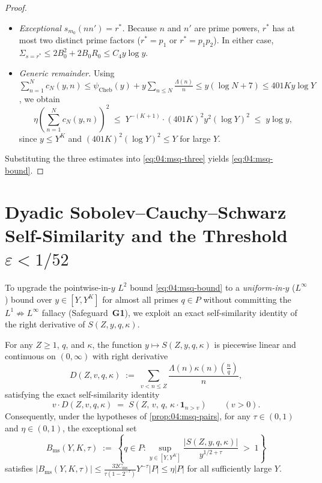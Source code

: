 \begin{proof}
\begin{itemize}
\item \emph{Exceptional $s_{m_0}(n n') = r^*$.} Because $n$ and $n'$ are prime powers, $r^*$ has at most two distinct prime factors ($r^* = p_1$ or $r^* = p_1 p_2$). In either case, $\Sigma_{s=r^*} \le 2 B_0^2 + 2 B_0 R_0 \le C_4 y\log y$.

\item \emph{Generic remainder.} Using $\sum_{n=1}^N c_N(y, n) \le \psi_{\mathrm{Cheb}}(y) + y\sum_{n \le N} \frac{\Lambda(n)}{n} \le y(\log N + 7) \le 401 K y \log Y$, we obtain
  \[
    \eta\!\left(\sum_{n=1}^N c_N(y, n)\right)^2 \;\le\; Y^{-(K+1)} \cdot (401 K)^2 y^2 (\log Y)^2 \;\le\; y \log y,
  \]
  since $y \le Y^K$ and $(401 K)^2 (\log Y)^2 \le Y$ for large $Y$.
\end{itemize}
Substituting the three estimates into \eqref{eq:04:msq-three} yields \eqref{eq:04:msq-bound}.
\end{proof}

\section{Dyadic Sobolev--Cauchy--Schwarz Self-Similarity and the Threshold $\varepsilon < 1/52$}
\label{sec:04:sobolev-perron}

To upgrade the pointwise-in-$y$ $L^2$ bound \eqref{eq:04:msq-bound} to a \emph{uniform-in-$y$} ($L^\infty$) bound over $y \in [Y, Y^K]$ for almost all primes $q \in P$ without committing the $L^1 \not\Rightarrow L^\infty$ fallacy (Safeguard~\textbf{G1}), we exploit an exact self-similarity identity of the right derivative of $S(Z, y, q, \kappa)$.

\begin{lemma}
\label{lem:04:sobolev-selfsim}
For any $Z \ge 1$, $q$, and $\kappa$, the function $y \mapsto S(Z, y, q, \kappa)$ is piecewise linear and continuous on $(0, \infty)$ with right derivative
\[
  D(Z, v, q, \kappa) \;:=\; \sum_{v < n \le Z} \frac{\Lambda(n)\kappa(n)(\frac{n}{q})}{n},
\]
satisfying the exact self-similarity identity
\begin{equation}
\label{eq:04:selfsim}
  v \cdot D(Z, v, q, \kappa) \;=\; S\!\left(Z,\, v,\, q,\, \kappa \cdot \mathbf{1}_{n > v}\right) \qquad (v > 0).
\end{equation}
Consequently, under the hypotheses of \cref{prop:04:msq-pairs}, for any $\tau \in (0, 1)$ and $\eta \in (0, 1)$, the exceptional set
\[
  B_{\mathrm{ms}}(Y, K, \tau) \;:=\; \left\{q \in P : \sup_{y \in [Y, Y^K]} \frac{|S(Z, y, q, \kappa)|}{y^{1/2 + \tau}} \;>\; 1\right\}
\]
satisfies $|B_{\mathrm{ms}}(Y, K, \tau)| \le \frac{32 C_{\mathrm{ms}}}{\tau(1 - 2^{-\tau})} Y^{-\tau} |P| \le \eta |P|$ for all sufficiently large $Y$.
\end{lemma}

